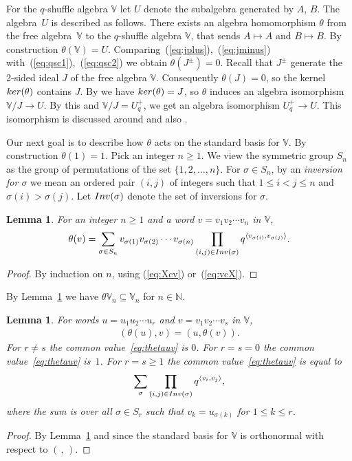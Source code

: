 \documentclass[11pt]{article}
\numberwithin{equation}{section}
\numberwithin{equation}{section}
\newtheorem{Lemma}[Theorem]{Lemma}
\begin{document}
{For the $q$-shuffle algebra $\mathbb V$ let $U$ denote the
subalgebra generated by $A$, $B$. The algebra~$U$ is described as follows.
There exists an algebra homomorphism $\theta$ from
the free algebra~$\mathbb V$ to the $q$-shuffle algebra $\mathbb V$, that sends
$A\mapsto A$ and $B\mapsto B$. By construction $\theta(\mathbb V)=U$.
Comparing~(\ref{eq:jplus}),~(\ref{eq:jminus}) with~(\ref{eq:qsc1}),~(\ref{eq:qsc2})
 we obtain $\theta(J^\pm)=0$.
Recall that $J^\pm$ generate the 2-sided ideal $J$ of
the free algebra $\mathbb V$. Consequently $\theta (J)=0$,
so the kernel ${\rm ker}(\theta)$ contains $J$.
 By
\cite[Theorem~15]{rosso} we have
 ${\rm ker}(\theta)=J$,
so $\theta$ induces an algebra isomorphism $\mathbb V/J\to U$.
By this and $\mathbb V/J=U^+_q$, we get an algebra
isomorphism $U^+_q\to U$.
This isomorphism is discussed
around \cite[Theorem~15]{rosso} and also \cite[p.~696]{leclerc}.

Our next goal is to describe how $\theta$ acts on the
standard basis for $\mathbb V$.
By construction $\theta(1)=1$.
Pick an integer $n\geq 1$.
We view the symmetric group $S_n$
as the group of permutations of the set
$\lbrace 1,2,\ldots, n\rbrace$. For $\sigma \in S_n$, by an
{\it inversion
for $\sigma$} we mean an ordered pair $(i,j)$ of integers
such that $1 \leq i< j \leq n$ and $\sigma(i) > \sigma(j)$.
Let ${\rm Inv}(\sigma)$ denote the set of inversions for $\sigma$.

\begin{Lemma}\label{lem:thform}For an integer $n\geq 1$ and a word $v=v_1 v_2 \cdots v_n$ in $\mathbb V$,
\begin{gather*}%
\theta(v) =\sum_{\sigma \in S_n}v_{\sigma(1)}v_{\sigma(2)} \cdots v_{\sigma(n)} \prod_{(i,j)\in {\rm Inv}(\sigma)} q^{\langle v_{\sigma(i)}, v_{\sigma(j)}\rangle}.
\end{gather*}
\end{Lemma}
\begin{proof}By induction on $n$, using (\ref{eq:Xcv}) or~(\ref{eq:vcX}).
\end{proof}

By Lemma~\ref{lem:thform} we have $\theta \mathbb V_n \subseteq \mathbb V_n $ for $n \in \mathbb N$.

\begin{Lemma}\label{lem:uvtheta}For words $u=u_1u_2\cdots u_r$ and $v=v_1v_2\cdots v_s$ in $\mathbb V$,
\begin{gather}
(\theta(u),v)= (u, \theta(v)).\label{eq:thetauv}
\end{gather}
For $r\not=s$ the common value~\eqref{eq:thetauv} is $0$. For $r=s=0$ the common value~\eqref{eq:thetauv} is~$1$. For $r=s\geq 1$ the common value~\eqref{eq:thetauv}
is equal to
\begin{gather*}
 \sum_{\sigma}\prod_{(i,j)\in {\rm Inv}(\sigma)}q^{\langle v_i, v_j \rangle},
\end{gather*}
where the sum is over all $\sigma \in S_r$ such that $v_k = u_{\sigma(k)}$ for $1 \leq k \leq r$.
\end{Lemma}
\begin{proof} By Lemma~\ref{lem:thform} and since the standard basis for $\mathbb V$ is orthonormal with respect to $(\,,\,)$.
\end{proof}

}
\end{document}
